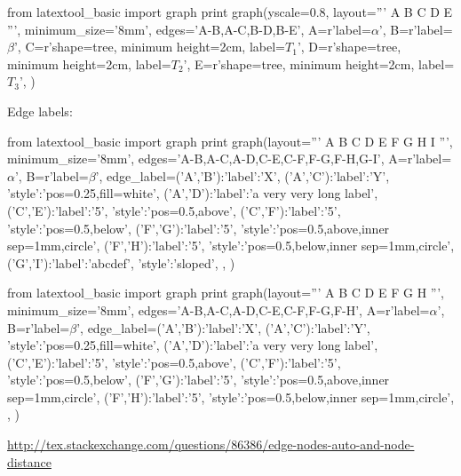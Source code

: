 \begin{python}
from latextool_basic import graph
print graph(yscale=0.8, layout='''
     A
   B   C
  D E
''',
minimum_size='8mm',
edges='A-B,A-C,B-D,B-E',
A=r'label=$\alpha$',
B=r'label=$\beta$',
C=r'shape=tree, minimum height=2cm, label=$T_1$',
D=r'shape=tree, minimum height=2cm, label=$T_2$',
E=r'shape=tree, minimum height=2cm, label=$T_3$',
)
\end{python}


\newpage
Edge labels:


\begin{console}
from latextool_basic import graph
print graph(layout='''
          A
   B      C      D
       E     F
          G     H
       I
''',
minimum_size='8mm',
edges='A-B,A-C,A-D,C-E,C-F,F-G,F-H,G-I',
A=r'label=$\alpha$',
B=r'label=$\beta$',
edge_label={('A','B'):{'label':'X'},
            ('A','C'):{'label':'Y', 'style':'pos=0.25,fill=white'},
            ('A','D'):{'label':'a very very long label'},
            ('C','E'):{'label':'5', 'style':'pos=0.5,above'},
            ('C','F'):{'label':'5', 'style':'pos=0.5,below'},
            ('F','G'):{'label':'5', 'style':'pos=0.5,above,inner sep=1mm,circle'},
            ('F','H'):{'label':'5', 'style':'pos=0.5,below,inner sep=1mm,circle'},
            ('G','I'):{'label':'abcdef', 'style':'sloped'},
           },
)
\end{console}
\begin{python}
from latextool_basic import graph
print graph(layout='''
          A
   B      C      D
       E     F
          G     H
''',
minimum_size='8mm',
edges='A-B,A-C,A-D,C-E,C-F,F-G,F-H',
A=r'label=$\alpha$',
B=r'label=$\beta$',
edge_label={('A','B'):{'label':'X'},
            ('A','C'):{'label':'Y', 'style':'pos=0.25,fill=white'},
            ('A','D'):{'label':'a very very long label'},
            ('C','E'):{'label':'5', 'style':'pos=0.5,above'},
            ('C','F'):{'label':'5', 'style':'pos=0.5,below'},
            ('F','G'):{'label':'5', 'style':'pos=0.5,above,inner sep=1mm,circle'},
            ('F','H'):{'label':'5', 'style':'pos=0.5,below,inner sep=1mm,circle'},
           },
)
\end{python}


\url{http://tex.stackexchange.com/questions/86386/edge-nodes-auto-and-node-distance}

